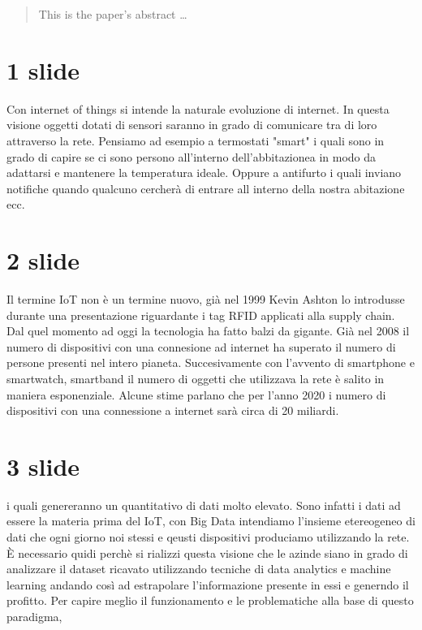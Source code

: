 \documentclass[12pt]{article}
\begin{document}
\maketitle

\begin{abstract}
This is the paper's abstract \ldots
\end{abstract}

\section{1 slide}
Con internet of things si intende la naturale evoluzione di internet. In questa
visione oggetti dotati di sensori saranno in grado di comunicare tra di loro
attraverso la rete. Pensiamo ad esempio a termostati "smart" i quali sono in
grado di capire se ci sono persono all'interno dell'abbitazionea in modo da
adattarsi e mantenere la temperatura ideale.
Oppure a antifurto i quali inviano notifiche quando qualcuno cercherà di entrare
all interno della nostra abitazione ecc.
\section{2 slide}
Il termine IoT non è un termine nuovo, già nel 1999 Kevin Ashton lo introdusse
durante una presentazione riguardante i tag RFID applicati alla supply chain.
Dal quel momento ad oggi la tecnologia ha fatto balzi da gigante. Già nel 2008
il numero di dispositivi con una connesione ad internet ha superato il numero di
persone presenti nel intero pianeta. Succesivamente con l'avvento di smartphone
e smartwatch, smartband il numero di oggetti che utilizzava la rete è salito in
maniera esponenziale. Alcune stime parlano che per l'anno 2020 i numero di
dispositivi con una connessione a internet sarà circa di 20 miliardi.
\section{3 slide}
i quali genereranno un quantitativo di dati molto elevato. Sono infatti i dati
ad essere la materia prima del IoT, con Big Data intendiamo l'insieme
etereogeneo di dati che ogni giorno noi stessi e qeusti dispositivi produciamo
utilizzando la rete. È necessario quidi perchè si rializzi questa visione che le
azinde siano in grado di analizzare il dataset ricavato utilizzando tecniche di
data analytics e machine learning andando così ad estrapolare l'informazione
presente in essi e generndo il profitto. Per capire meglio il funzionamento e le
problematiche alla base di questo paradigma, 
\end{document}
